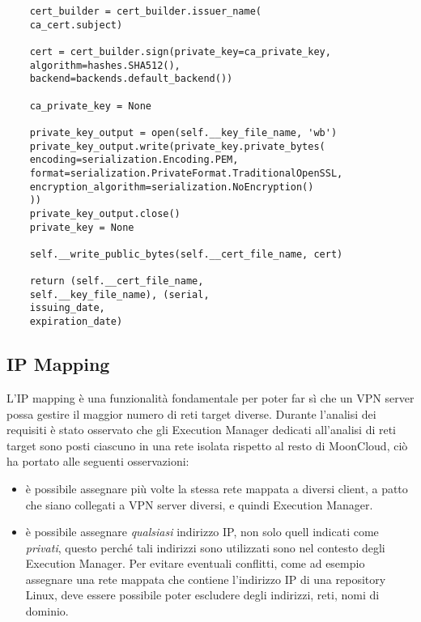 \begin{verbatim}
	cert_builder = cert_builder.issuer_name(
	ca_cert.subject)
	
	cert = cert_builder.sign(private_key=ca_private_key,
	algorithm=hashes.SHA512(),
	backend=backends.default_backend())
	
	ca_private_key = None
	
	private_key_output = open(self.__key_file_name, 'wb')
	private_key_output.write(private_key.private_bytes(
	encoding=serialization.Encoding.PEM,
	format=serialization.PrivateFormat.TraditionalOpenSSL,
	encryption_algorithm=serialization.NoEncryption()
	))
	private_key_output.close()
	private_key = None
	
	self.__write_public_bytes(self.__cert_file_name, cert)
	
	return (self.__cert_file_name,
	self.__key_file_name), (serial,
	issuing_date,
	expiration_date)
\end{verbatim}


\subsection{IP Mapping}
L'IP mapping è una funzionalità fondamentale per poter far sì che un VPN server possa
gestire il maggior numero di reti target diverse.
Durante l'analisi dei requisiti è stato osservato che
gli Execution Manager dedicati all'analisi di reti target sono posti
ciascuno in una rete isolata rispetto al resto di MoonCloud, ciò ha portato
alle seguenti osservazioni:
\begin{itemize}
	\item è possibile assegnare più volte la stessa rete mappata a diversi client,
	      a patto che siano collegati a VPN server diversi, e quindi Execution Manager.
	\item è possibile assegnare \textit{qualsiasi} indirizzo IP, non solo quell
	      indicati come \textit{privati}, questo perché tali indirizzi sono utilizzati
	      sono nel contesto degli Execution Manager. Per evitare eventuali conflitti,
	      come ad esempio assegnare una rete mappata che contiene l'indirizzo IP
	      di una repository Linux, deve essere possibile poter escludere degli indirizzi,
	      reti, nomi di dominio.
\end{itemize}

